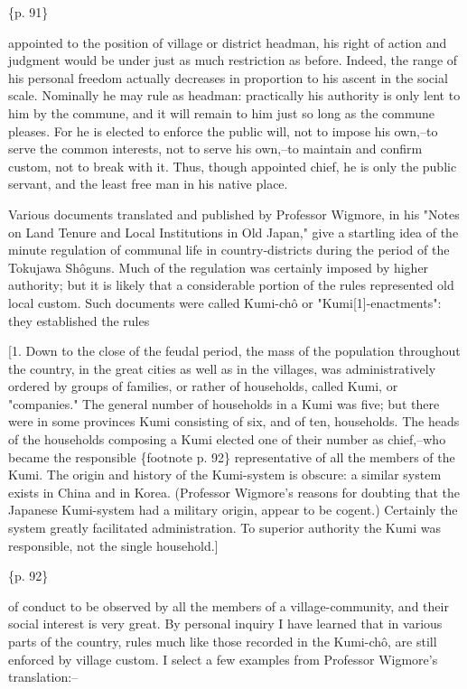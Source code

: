 \{p. 91\}

appointed to the position of village or district headman, his right of action and judgment would be under just as much restriction as before. Indeed, the range of his personal freedom actually decreases in proportion to his ascent in the social scale. Nominally he may rule as headman: practically his authority is only lent to him by the commune, and it will remain to him just so long as the commune pleases. For he is elected to enforce the public will, not to impose his own,--to serve the common interests, not to serve his own,--to maintain and confirm custom, not to break with it. Thus, though appointed chief, he is only the public servant, and the least free man in his native place.

Various documents translated and published by Professor Wigmore, in his "Notes on Land Tenure and Local Institutions in Old Japan," give a startling idea of the minute regulation of communal life in country-districts during the period of the Tokujawa Shôguns. Much of the regulation was certainly imposed by higher authority; but it is likely that a considerable portion of the rules represented old local custom. Such documents were called Kumi-chô or "Kumi[1]-enactments": they established the rules

[1. Down to the close of the feudal period, the mass of the population throughout the country, in the great cities as well as in the villages, was administratively ordered by groups of families, or rather of households, called Kumi, or "companies." The general number of households in a Kumi was five; but there were in some provinces Kumi consisting of six, and of ten, households. The heads of the households composing a Kumi elected one of their number as chief,--who became the responsible \{footnote p. 92\} representative of all the members of the Kumi. The origin and history of the Kumi-system is obscure: a similar system exists in China and in Korea. (Professor Wigmore's reasons for doubting that the Japanese Kumi-system had a military origin, appear to be cogent.) Certainly the system greatly facilitated administration. To superior authority the Kumi was responsible, not the single household.]

\{p. 92\}

of conduct to be observed by all the members of a village-community, and their social interest is very great. By personal inquiry I have learned that in various parts of the country, rules much like those recorded in the Kumi-chô, are still enforced by village custom. I select a few examples from Professor Wigmore's translation:--

